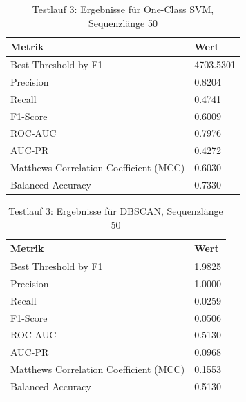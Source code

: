 \documentclass[a4paper,12pt]{article}
\begin{document}
\begin{table}[H]
	\centering
	\begin{tabular}{ll}
		\toprule
		\textbf{Metrik} & \textbf{Wert} \\
		\midrule
		Best Threshold by F1 & 4703.5301 \\
		Precision & 0.8204 \\
		Recall & 0.4741 \\
		F1-Score & 0.6009 \\
		ROC-AUC & 0.7976 \\
		AUC-PR & 0.4272 \\
		Matthews Correlation Coefficient (MCC) & 0.6030 \\
		Balanced Accuracy & 0.7330 \\
		\bottomrule
	\end{tabular}
	\caption{Testlauf 3: Ergebnisse für One-Class SVM, Sequenzlänge 50}
\end{table}

\begin{table}[H]
	\centering
	\begin{tabular}{ll}
		\toprule
		\textbf{Metrik} & \textbf{Wert} \\
		\midrule
		Best Threshold by F1 & 1.9825 \\
		Precision & 1.0000 \\
		Recall & 0.0259 \\
		F1-Score & 0.0506 \\
		ROC-AUC & 0.5130 \\
		AUC-PR & 0.0968 \\
		Matthews Correlation Coefficient (MCC) & 0.1553 \\
		Balanced Accuracy & 0.5130 \\
		\bottomrule
	\end{tabular}
	\caption{Testlauf 3: Ergebnisse für DBSCAN, Sequenzlänge 50}
\end{table}


\newpage	
\end{document}
